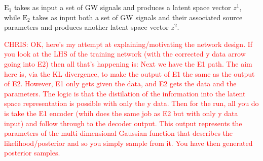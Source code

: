 \documentclass[%
showpacs,
 amsmath,amssymb,
 aps,
 twocolumn,
 prl,
 reprint,
floatfix,
]{revtex4-1}
\newcommand{\chris}[1]{\textcolor{red}{CHRIS: #1}}
\begin{document}
$\textrm{E}_1$ takes as input a set of \ac{GW} signals and produces a latent
space vector $z^1$, while $\textrm{E}_2$ takes as input both a set of GW
signals and their associated source parameters and produces another latent
space vector $z^2$.

\chris{OK, here's my attempt at explaining/motivating the network design. If
you look at the LHS of the training network (with the corrected y data arrow
going into E2) then all that's happening is:
%
Next we have the E1 path. The aim here is, via the KL divergence, to make the
output of E1 the same as the output of E2. However, E1 only gets given the
data, and E2 gets the data and the parameters. The logic is that the
distilation of the information into the latent space representation is possible
with only the y data.
%
Then for the run, all you do is take the E1 encoder (whih does the same job as
E2 but with only y data input) and follow through to the decoder output. This
output represents the parameters of the multi-dimensional Gaussian function
that describes the likelihood/posterior and so you simply sample from it. You
have then generated posterior samples.
}
\end{document}
